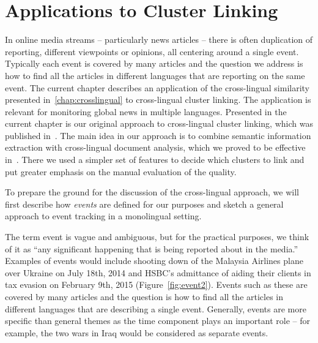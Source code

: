 %
\chapter{Applications to Cluster Linking}\label{chap:applications}

In online media streams -- particularly news articles -- there is often duplication of reporting,
different viewpoints or opinions, all centering around a single event. Typically each event is covered by many articles
and the question we address is how to find all the articles in different languages that are reporting on the same event.
The current chapter describes an application of the cross-lingual similarity presented in~\ref{chap:crosslingual}
to cross-lingual cluster linking. The application is relevant for monitoring global news in multiple languages.
Presented in the current chapter is our original approach to cross-lingual cluster linking, 
which was published in~\cite{2015arXiv151207046R}. The main idea in our approach is to combine
semantic information extraction with cross-lingual document analysis, which we proved to be
effective in~\cite{Belyaeva201564}. There we used a simpler set of features to 
decide which clusters to link and put greater emphasis on the manual evaluation of the quality. 

To prepare the ground for the discussion of the cross-lingual approach, we will first
describe how \emph{events} are defined for our purposes and  
sketch a general approach to event tracking in a monolingual setting.

The term event is vague and ambiguous, but for the practical purposes,
we think of it as ``any significant happening that is being reported about in the media.''
Examples of events would include shooting down of the Malaysia Airlines plane over Ukraine
on July 18th, 2014 and HSBC's admittance of aiding their clients in tax evasion on
February 9th, 2015 (Figure~\ref{fig:event2}). Events such as these are covered by many
articles and the question is how to find all the articles in different languages
that are describing a single event. Generally, events are more specific than
general themes as the time component plays an important role -- for example,
the two wars in Iraq would be considered as separate events.

